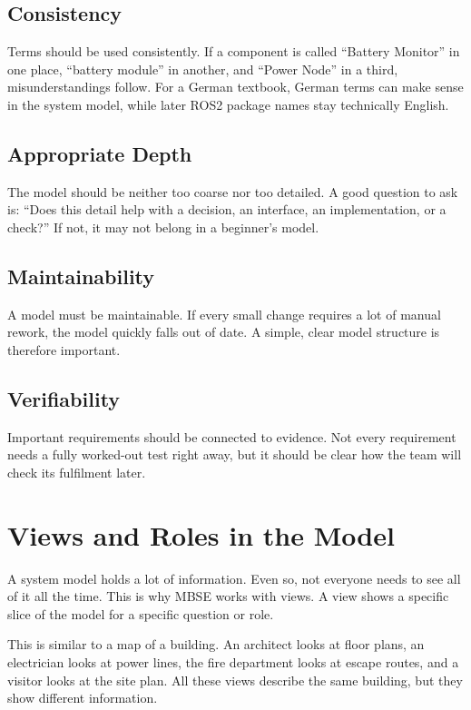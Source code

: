 \subsection{Consistency}
Terms should be used consistently. If a component is called \enquote{Battery Monitor} in one place, \enquote{battery module} in another, and \enquote{Power Node} in a third, misunderstandings follow. For a German textbook, German terms can make sense in the system model, while later ROS2 package names stay technically English.

\subsection{Appropriate Depth}
The model should be neither too coarse nor too detailed. A good question to ask is: \enquote{Does this detail help with a decision, an interface, an implementation, or a check?} If not, it may not belong in a beginner's model.

\subsection{Maintainability}
A model must be maintainable. If every small change requires a lot of manual rework, the model quickly falls out of date. A simple, clear model structure is therefore important.

\subsection{Verifiability}
Important requirements should be connected to evidence. Not every requirement needs a fully worked-out test right away, but it should be clear how the team will check its fulfilment later.

\section{Views and Roles in the Model}
A system model holds a lot of information. Even so, not everyone needs to see all of it all the time. This is why MBSE works with views. A view shows a specific slice of the model for a specific question or role.

This is similar to a map of a building. An architect looks at floor plans, an electrician looks at power lines, the fire department looks at escape routes, and a visitor looks at the site plan. All these views describe the same building, but they show different information.

